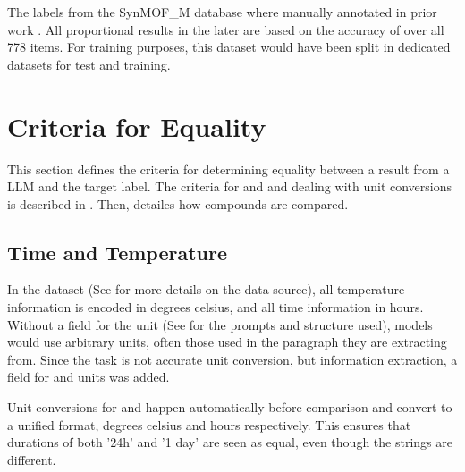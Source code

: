 
The labels from the SynMOF\_M database where manually annotated in prior work \cite{luo_mof_2022}.
All proportional results in the later  are based on the accuracy of over all 778 items.
For training purposes, this dataset would have been split in dedicated datasets for test and training.

\section{Criteria for Equality}\label{sec:equality}
This section defines the criteria for determining equality between a result from a \gls{LLM} and the target label.
The criteria for \ttemp and \ttime and dealing with unit conversions is described in .
Then,  detailes how compounds are compared.

\subsection{Time and Temperature}\label{sub:ttunit}
In the dataset (See  for more details on the data source), all temperature information is encoded in degrees celsius, and all time information in hours.
Without a field for the unit (See  for the prompts and structure used), models would use arbitrary units, often those used in the paragraph they are extracting from.
Since the task is not accurate unit conversion, but information extraction, a field for \ttemp and \ttime units was added.

Unit conversions for \ttemp and \ttime happen automatically before comparison and convert to a unified format, degrees celsius and hours respectively.
This ensures that durations of both '24h' and '1 day' are seen as equal, even though the strings are different.


